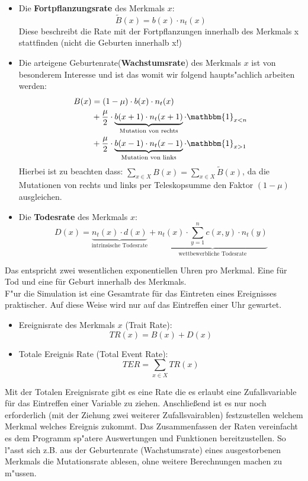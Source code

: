 \documentclass[11pt, a4paper, german]{article}
\theoremstyle{plain}
\begin{document}
	\begin{itemize}
		\item Die \textbf{Fortpflanzungsrate} des Merkmals $ x $: 
		\[ \tilde{B}(x) = b(x) \cdot n_t(x) \]
		Diese beschreibt die Rate mit der Fortpflanzungen innerhalb des Merkmals x stattfinden (nicht die Geburten innerhalb x!)\\
		\item Die arteigene Geburtenrate(\textbf{Wachstumsrate}) des Merkmals $ x $ ist von besonderem Interesse und ist das womit wir folgend haupts"achlich arbeiten werden: 
		\begin{align*}
			B(x)  & = (1 - \mu) \cdot b(x) \cdot n_t(x)\\
				  & + \frac{\mu}{2} \cdot \underbrace{b(x+1) \cdot n_t(x+1)}_{\text{Mutation von rechts}} \cdot \mathbbm{1}_{x<n}\\
				  & + \frac{\mu}{2} \cdot \underbrace{b(x-1) \cdot n_t(x-1)}_{\text{Mutation von links}} \cdot \mathbbm{1}_{x>1}
		\end{align*}
		Hierbei ist zu beachten dass: $ \sum_{x \in X} B(x)  = \sum_{x \in X} \tilde{B}(x)$, da die Mutationen von rechts und links per Teleskopsumme den Faktor $ (1-\mu) $ ausgleichen.
		
		\item Die \textbf{Todesrate} des Merkmals $ x $:
		\[ D(x) = \underbrace{n_t(x) \cdot d(x)}_{\text{intrinsische Todesrate}} + \underbrace{n_t(x) \cdot \sum_{y=1}^{n} c(x,y) \cdot n_t(y)}_{\text{wettbewerbliche Todesrate}}  \]
	\end{itemize}
	Das entspricht zwei wesentlichen exponentiellen Uhren pro Merkmal. Eine für Tod und eine für Geburt innerhalb des Merkmals.\\
	F"ur die Simulation ist eine Gesamtrate für das Eintreten eines Ereignisses praktischer. Auf diese Weise wird nur auf das Eintreffen einer Uhr gewartet.
	\begin{itemize}
		\item Ereignisrate des Merkmals $ x $ (Trait Rate):
		\[ TR(x) = B(x) + D(x) \]
		\item Totale Ereignis Rate (Total Event Rate): 
		\[ TER = \sum_{x \in X} TR(x)\]
	\end{itemize}
	Mit der Totalen Ereignisrate gibt es eine Rate die es erlaubt eine Zufallsvariable für das Eintreffen einer Variable zu ziehen. Anschließend ist es nur noch erforderlich (mit der Ziehung zwei weiterer Zufallsvairablen) festzustellen welchem Merkmal welches Ereignis zukommt. Das Zusammenfassen der Raten vereinfacht es dem Programm sp"atere Auswertungen und Funktionen bereitzustellen. So l"asst sich z.B. aus der Geburtenrate (Wachstumsrate) eines ausgestorbenen Merkmals die Mutationsrate ablesen, ohne weitere Berechnungen machen zu m"ussen.\\
	
\end{document}
